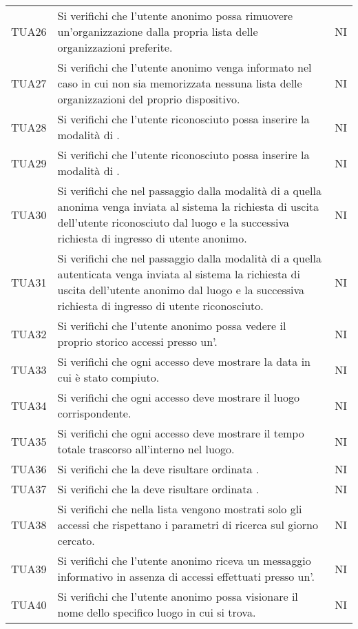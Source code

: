 {\begin{longtable}{ c C{13cm} C{1cm}}
TUA26 & Si verifichi che l'utente anonimo possa rimuovere un'organizzazione dalla propria lista delle organizzazioni preferite. & NI \\
TUA27 & Si verifichi che l'utente anonimo venga informato nel caso in cui non sia memorizzata nessuna lista delle organizzazioni del proprio dispositivo. & NI \\
TUA28 & Si verifichi che l'utente riconosciuto possa inserire la modalità di . & NI \\
TUA29 & Si verifichi che l'utente riconosciuto possa inserire la modalità di . & NI \\
TUA30 & Si verifichi che nel passaggio dalla modalità di  a quella anonima venga inviata al sistema la richiesta di uscita dell'utente riconosciuto dal luogo e la successiva richiesta di ingresso di utente anonimo. & NI \\
TUA31 & Si verifichi che nel passaggio dalla modalità di  a quella autenticata venga inviata al sistema la richiesta di uscita dell'utente anonimo dal luogo e la successiva richiesta di ingresso di utente riconosciuto. & NI \\
TUA32 & Si verifichi che l'utente anonimo possa vedere il proprio storico accessi presso un'. & NI \\
TUA33 & Si verifichi che ogni accesso deve mostrare la data in cui è stato compiuto. & NI \\
TUA34 & Si verifichi che ogni accesso deve mostrare il luogo corrispondente.  & NI \\
TUA35 & Si verifichi che ogni accesso deve mostrare il tempo totale trascorso all'interno nel luogo. & NI \\
TUA36 & Si verifichi che la  deve risultare ordinata . & NI \\
TUA37 & Si verifichi che la  deve risultare ordinata . & NI \\
TUA38 & Si verifichi che nella lista vengono mostrati solo gli accessi che rispettano i parametri di ricerca sul giorno cercato. & NI \\
TUA39 & Si verifichi che l’utente anonimo riceva un messaggio informativo in assenza di accessi effettuati presso un'. & NI \\
TUA40 & Si verifichi che l’utente anonimo possa visionare il nome dello specifico luogo in cui si trova. & NI \\

\end{longtable}}
